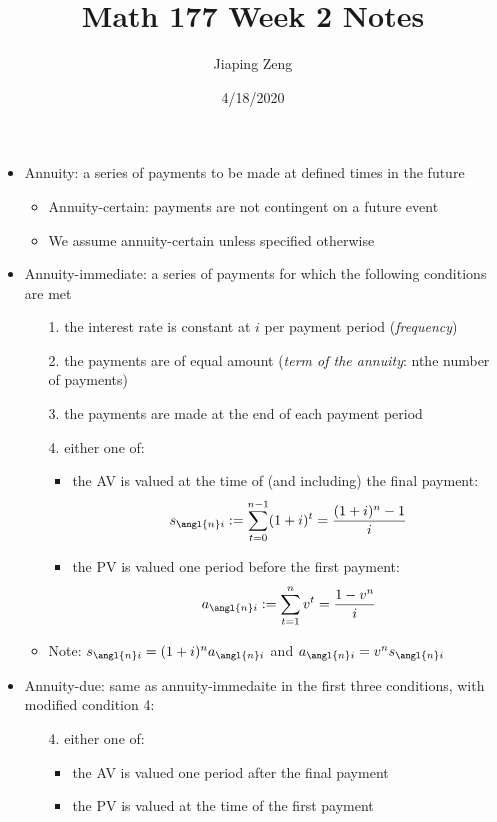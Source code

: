 \documentclass{article}
\title{Math 177 Week 2 Notes}
\author{Jiaping Zeng}
\date{4/18/2020}
\begin{document}
\maketitle

\begin{itemize}
	\item Annuity: a series of payments to be made at defined times in the future
	      \begin{itemize}
		      \item Annuity-certain: payments are not contingent on a future event
		      \item We assume annuity-certain unless specified otherwise
	      \end{itemize}
	\item Annuity-immediate: a series of payments for which the following conditions are met
	      \begin{itemize}
		      \item [1.] the interest rate is constant at $i$ per payment period (\textit{frequency})
		      \item [2.] the payments are of equal amount (\textit{term of the annuity}: nthe number of payments)
		      \item [3.] the payments are made at the end of each payment period
		      \item [4.] either one of:
		            \begin{itemize}
			            \item the AV is valued at the time of (and including) the final payment: \[s_{\angl{n}i}:=\sum_{t=0}^{n-1}(1+i)^t=\frac{(1+i)^n-1}{i}\]
			            \item the PV is valued one period before the first payment: \[a_{\angl{n}i}:=\sum_{t=1}^{n}v^t=\frac{1-v^n}{i}\]
		            \end{itemize}
		      \item Note: $s_{\angl{n}i}=(1+i)^na_{\angl{n}i}$ and $a_{\angl{n}i}=v^ns_{\angl{n}i}$
	      \end{itemize}
	\item Annuity-due: same as annuity-immedaite in the first three conditions, with modified condition 4:
	      \begin{itemize}
		      \item [4.] either one of:
		            \begin{itemize}
			            \item the AV is valued one period after the final payment
			            \item the PV is valued at the time of the first payment
		            \end{itemize}
	      \end{itemize}
\end{itemize}
\end{document}
